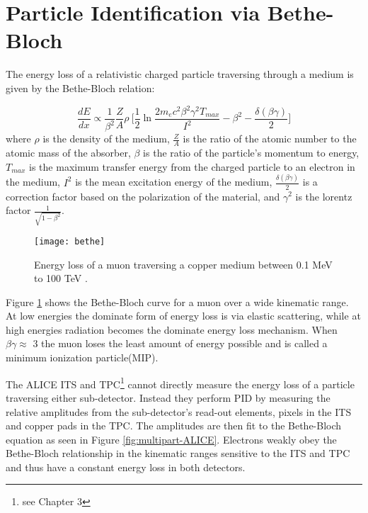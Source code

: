 \section{Particle Identification via Bethe-Bloch}\label{ref:pid}


The energy loss of a relativistic charged particle traversing through a medium is given by the Bethe-Bloch relation:

\begin{equation}
\frac{dE}{dx} \propto \frac{1}{\beta^{2}} \frac{Z}{A} \rho \  \bigg[ \frac{1}{2} \ln \frac{2 m_{e} c^{2} \beta^{2} \gamma^{2} T_{max}}{I^{2}} - \beta^{2} - \frac{\delta \left( \beta \gamma \right) }{2} \bigg]
\end{equation}
\noindent
where $\rho$ is the density of the medium, $\frac{Z}{A}$ is the ratio of the atomic number to the atomic mass of the absorber, $\beta$ is the ratio of the particle's momentum to energy, $T_{max}$ is the maximum transfer energy from the charged particle to an electron in the medium,  $I^{2}$ is the mean excitation energy of the medium, $\frac{\delta \left( \beta \gamma \right) }{2}$ is a correction factor based on the polarization of the material, and $\gamma^{2}$ is the lorentz factor $\frac{1}{\sqrt{1-\beta^{2}}}$.

\begin{figure}[h]
\texttt{[image: bethe]}
\centering
\caption{ Energy loss of a muon traversing a copper medium between 0.1 MeV to 100 TeV \cite{Patrignani:2016xqp}.}
\label{fig:rawBB}
\end{figure}

Figure \ref{fig:rawBB} shows the Bethe-Bloch curve for a muon over a wide kinematic range.  At low energies the dominate form of energy loss is via elastic scattering, while at high energies radiation becomes the dominate energy loss mechanism. When $\beta \gamma \approx$ 3 the muon loses the least amount of energy possible and is called a minimum ionization particle(MIP).  

The ALICE ITS and TPC\footnote{see Chapter 3} cannot directly measure the energy loss of a particle traversing either sub-detector.  Instead they perform PID by measuring the relative amplitudes from the sub-detector's read-out elements, pixels in the ITS and copper pads in the TPC.  The amplitudes are then fit to the Bethe-Bloch equation as seen in Figure \ref{fig:multipart-ALICE}.  Electrons weakly obey the Bethe-Bloch relationship in the kinematic ranges sensitive to the ITS and TPC and thus have a constant energy loss in both detectors.

